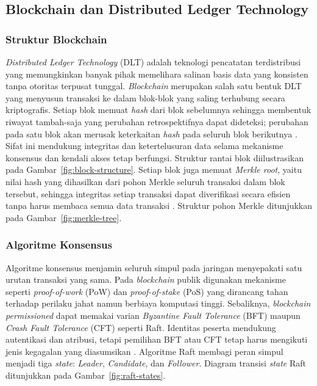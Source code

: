 \subsection{Blockchain dan Distributed Ledger Technology}

\subsubsection{Struktur Blockchain}

\textit{Distributed Ledger Technology} (DLT) adalah teknologi pencatatan
terdistribusi yang memungkinkan banyak pihak memelihara salinan basis data yang
konsisten tanpa otoritas terpusat tunggal. \textit{Blockchain} merupakan salah
satu bentuk DLT yang menyusun transaksi ke dalam blok-blok yang saling
terhubung secara kriptografis. Setiap blok memuat \textit{hash} dari blok
sebelumnya sehingga membentuk riwayat tambah-saja yang perubahan retrospektifnya
dapat dideteksi; perubahan pada satu blok akan merusak keterkaitan \textit{hash}
pada seluruh blok berikutnya \cite{unknown2022}. Sifat ini mendukung integritas
dan ketertelusuran data selama mekanisme konsensus dan kendali akses tetap
berfungsi. Struktur rantai blok diilustrasikan pada
Gambar~\ref{fig:block-structure}.
Setiap blok juga memuat \textit{Merkle root}, yaitu nilai hash yang dihasilkan
dari pohon Merkle seluruh transaksi dalam blok tersebut, sehingga integritas
setiap transaksi dapat diverifikasi secara efisien tanpa harus membaca semua
data transaksi \cite{unknown2022}. Struktur pohon Merkle ditunjukkan pada
Gambar~\ref{fig:merkle-tree}.



\subsubsection{Algoritme Konsensus}

Algoritme konsensus menjamin seluruh simpul pada jaringan menyepakati satu
urutan transaksi yang sama. Pada \textit{blockchain} publik digunakan mekanisme
seperti \textit{proof-of-work} (PoW) dan \textit{proof-of-stake} (PoS) yang
dirancang tahan terhadap perilaku jahat namun berbiaya komputasi tinggi.
Sebaliknya, \textit{blockchain permissioned} dapat memakai varian
\textit{Byzantine Fault Tolerance} (BFT) maupun \textit{Crash Fault Tolerance}
(CFT) seperti Raft. Identitas peserta mendukung autentikasi dan atribusi, tetapi
pemilihan BFT atau CFT tetap harus mengikuti jenis kegagalan yang diasumsikan
\cite{consensusanalysis, androulaki2018}. Algoritme Raft membagi peran simpul
menjadi tiga \textit{state}: \textit{Leader}, \textit{Candidate}, dan
\textit{Follower}. Diagram transisi \textit{state} Raft ditunjukkan pada
Gambar~\ref{fig:raft-states}.

